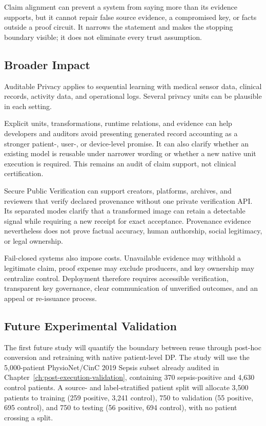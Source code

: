 Claim alignment can prevent a system from saying more than its evidence supports,
but it cannot repair false source evidence, a compromised key, or facts outside a
proof circuit.  It narrows the statement and makes the stopping boundary visible;
it does not eliminate every trust assumption.

\subsection{Broader Impact}
\label{subsec:ch5-broader-impact}

Auditable Privacy applies to sequential learning with medical sensor data,
clinical records, activity data, and operational logs.  Several privacy units can
be plausible in each setting.

Explicit units, transformations, runtime relations, and evidence can
help developers and auditors avoid presenting generated record accounting as a
stronger patient-, user-, or device-level promise.  It can also clarify whether an
existing model is reusable under narrower wording or whether a new native unit
execution is required.  This remains an audit of claim support, not clinical
certification.

Secure Public Verification can support creators, platforms, archives, and
reviewers that verify declared provenance without one private verification API.
Its separated modes clarify that a transformed image can retain a detectable
signal while requiring a new receipt for exact acceptance.  Provenance evidence
nevertheless does not prove factual accuracy, human authorship, social legitimacy,
or legal ownership.

Fail-closed systems also impose costs.  Unavailable evidence may withhold a
legitimate claim, proof expense may exclude producers, and key ownership may
centralize control.  Deployment therefore requires accessible verification,
transparent key governance, clear communication of unverified outcomes, and an
appeal or re-issuance process.

\subsection{Future Experimental Validation}
\label{subsec:ch5-future-validation}

The first future study will quantify the boundary between reuse through post-hoc
conversion and retraining with native patient-level DP.  The study will use the
5,000-patient PhysioNet/CinC 2019 Sepsis subset already audited in
Chapter~\ref{ch:post-execution-validation}, containing 370 sepsis-positive and
4,630 control patients.  A source- and label-stratified patient split will allocate
3,500 patients to training (259 positive, 3,241 control), 750 to validation (55
positive, 695 control), and 750 to testing (56 positive, 694 control), with no
patient crossing a split.


